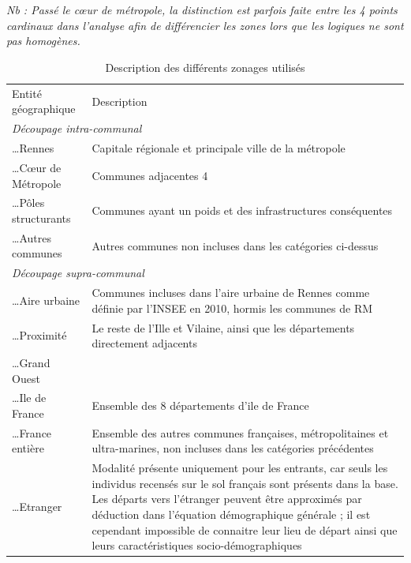 \documentclass{bredele}
\begin{document}
\\\\ \textit{Nb : Passé le cœur de métropole, la distinction est parfois faite entre les 4 points cardinaux dans l’analyse afin de différencier les zones lors que les logiques ne sont pas homogènes.}
\renewcommand{\arraystretch}{1.5}
\begin{table}
\begin{tabular}{| l | p{11cm} |}
\hline \large{Entité géographique} &  \large{Description} \\
\cline{1-2}
\multicolumn{2}{|l|}{\large{\textit{Découpage intra-communal}}} \\
\hline \ldots Rennes & Capitale régionale et principale ville de la métropole \\
\hline \ldots Cœur de Métropole & Communes adjacentes 4 \\
\hline \ldots Pôles structurants & Communes ayant un poids et des infrastructures conséquentes \\
\hline \ldots Autres communes & Autres communes non incluses dans les catégories ci-dessus \\
\cline{1-2}
\multicolumn{2}{|l|}{\large{\textit{Découpage supra-communal}}} \\
\hline \ldots Aire urbaine & Communes incluses dans l’aire urbaine de Rennes comme définie par l’INSEE en 2010, hormis les communes de RM \\
\hline \ldots Proximité & Le reste de l’Ille et Vilaine, ainsi que les départements directement adjacents \\
\hline \ldots Grand Ouest & \\
\hline \ldots Ile de France & Ensemble des 8 départements d’ile de France \\
\hline \ldots France entière & Ensemble des autres communes françaises, métropolitaines et ultra-marines, non incluses dans les catégories précédentes \\
\hline \ldots Etranger & Modalité présente uniquement pour les entrants, car seuls les individus recensés sur le sol français sont présents dans la base. Les départs vers l’étranger peuvent être approximés par déduction dans l’équation démographique générale ; il est cependant impossible de connaitre leur lieu de départ ainsi que leurs caractéristiques socio-démographiques \\
\hline
 \end{tabular}
\caption{Description des différents zonages utilisés}
\end{table}
\end{document}
